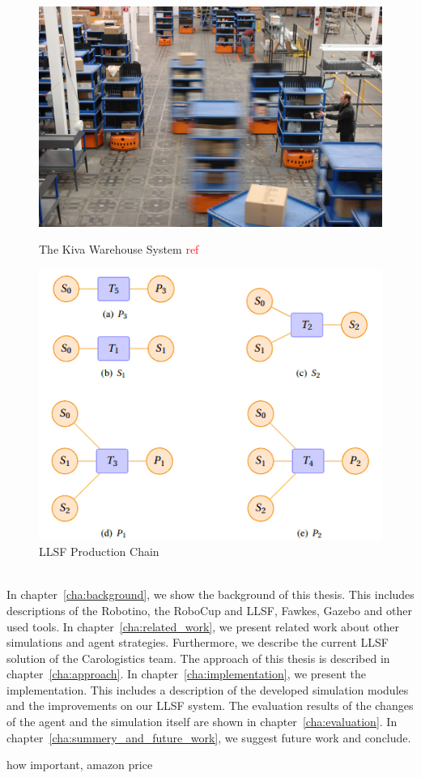 \begin{figure}
\begin{minipage}[b]{0.5\linewidth}
\includegraphics[width=\textwidth]{pics/kiva}
\caption{The Kiva Warehouse System \textcolor{red}{ref}}
\label{fig:kiva}
\end{minipage}
\quad
\begin{minipage}[b]{0.5\linewidth}
\includegraphics[scale=0.45]{pics/production_chain}
\caption{LLSF Production Chain~\cite{LLSFRules}}
\label{fig:llsf_chain}
\end{minipage}
\end{figure}
\\
In chapter~\ref{cha:background}, we show the background of this thesis. This includes descriptions of the Robotino, the RoboCup and LLSF, Fawkes, Gazebo and other used tools. In chapter~\ref{cha:related_work}, we present related work about other simulations and agent strategies. Furthermore, we describe the current LLSF solution of the Carologistics team. The approach of this thesis is described in chapter~\ref{cha:approach}. In chapter~\ref{cha:implementation}, we present the implementation. This includes a description of the developed simulation modules and the improvements on our LLSF system. The evaluation results of the changes of the agent and the simulation itself are shown in chapter~\ref{cha:evaluation}. In chapter~\ref{cha:summery_and_future_work}, we suggest future work and conclude.


how important, amazon price
